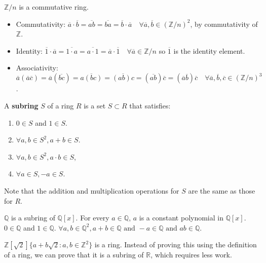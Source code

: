 \begin{example}
	$\mathbb{Z} / n$ is a commutative ring.

	\begin{itemize}
		\item Commutativity: $\overline{a} \cdot \overline{b} = \overline{ab} = \overline{ba} = \overline{b} \cdot \overline{a} \quad \forall \overline{a}, \overline{b} \in {(\mathbb{Z} / n)}^2$, by commutativity of $\mathbb{Z}$.
		\item Identity: $\overline{1} \cdot \overline{a} = \overline{1 \cdot a} = \overline{a \cdot 1} = \overline{a} \cdot \overline{1} \quad \forall \overline{a} \in \mathbb{Z} / n$ so $\overline{1}$ is the identity element.
		\item Associativity: $\overline{a} (\overline{a} \overline{c}) = \overline{a} (\overline{bc}) = \overline{a(bc)} = \overline{(ab)c} = (\overline{ab}) \overline{c} = (\overline{a} \overline{b}) \overline{c} \quad \forall \overline{a}, \overline{b}, \overline{c} \in {(\mathbb{Z} / n)}^3$.
	\end{itemize}
\end{example}

\begin{definition}
	A \textbf{subring} $S$ of a ring $R$ is a set $S \subset R$ that satisfies:
	\begin{enumerate}
		\item $0 \in S$ and $1 \in S$.
		\item $\forall a, b \in S^2, a + b \in S$.
		\item $\forall a, b \in S^2, a \cdot b \in S$,
		\item $\forall a \in S, -a \in S$.
	\end{enumerate}
	Note that the addition and multiplication operations for $S$ are the same as those for $R$.
\end{definition}

\begin{example}
	$\mathbb{Q}$ is a subring of $\mathbb{Q}[x]$. For every $a \in \mathbb{Q}$, $a$ is a constant polynomial in $\mathbb{Q}[x]$. $0 \in \mathbb{Q}$ and $1 \in \mathbb{Q}$. $\forall a, b \in \mathbb{Q}^2, a + b \in \mathbb{Q} \text{ and } -a \in \mathbb{Q} \text{ and } ab \in \mathbb{Q}$.
\end{example}

\begin{example}
	$\mathbb{Z}[\sqrt{2}]  \{ a + b \sqrt{2}: a, b \in \mathbb{Z}^2 \}$ is a ring. Instead of proving this using the definition of a ring, we can prove that it is a subring of $\mathbb{R}$, which requires less work.
\end{example}

